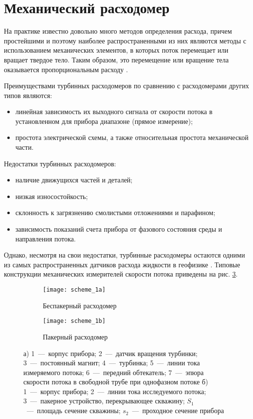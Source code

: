 \section{Механический расходомер}

На практике известно довольно много методов определения
расхода, причем простейшими и поэтому наиболее распространенными
из них являются методы с использованием механических элементов, в
которых поток перемещает или вращает твердое тело. Таким образом, это
перемещение или вращение тела оказывается пропорциональным расходу \cite{physfields}.

Преимуществами турбинных расходомеров по сравнению с расходомерами других типов являются:
\begin{itemize}
    \item линейная зависимость их выходного сигнала от скорости потока в установленном для прибора диапазоне (прямое измерение);
    \item простота электрической схемы, а также относительная простота механической части.
\end{itemize}

Недостатки турбинных расходомеров:
\begin{itemize}
    \item наличие движущихся частей и деталей;
    \item низкая износостойкость;
    \item склонность к загрязнению смолистыми отложениями и парафином;
    \item зависимость показаний счета прибора от фазового состояния среды и направления потока.
\end{itemize}

Однако, несмотря на свои недостатки,
турбинные расходомеры остаются одними из
самых распространенных датчиков расхода
жидкости в геофизике  \cite{physfields}. Типовые конструкции
механических измерителей скорости потока
приведены на рис. \ref{fig:scheme_1}.

\begin{figure}[h]

\begin{subfigure}{0.5\textwidth}
\centering
\texttt{[image: scheme\_1a]} 
\caption{Беспакерный расходомер}
\label{fig:subim1}

\end{subfigure}
\begin{subfigure}{0.5\textwidth}
\centering
\texttt{[image: scheme\_1b]}
\caption{Пакерный расходомер}
\label{fig:subim2}
\end{subfigure}

\caption{
а)
1~---~корпус прибора; 2~---~датчик вращения турбинки;
3~---~постоянный магнит; 4~---~турбинка;
5~---~линии тока измеряемого потока; 6~---~передний обтекатель;
7~---~эпюра скорости потока в свободной трубе при однофазном потоке
б)
1~---~корпус прибора; 2~---~линии тока исследуемого потока;
3~---~пакерное устройство, перекрывающее скважину;
$S_1$~---~площадь сечение скважины;
$s_2$~---~проходное сечение прибора
}
\label{fig:scheme_1}

\end{figure}

